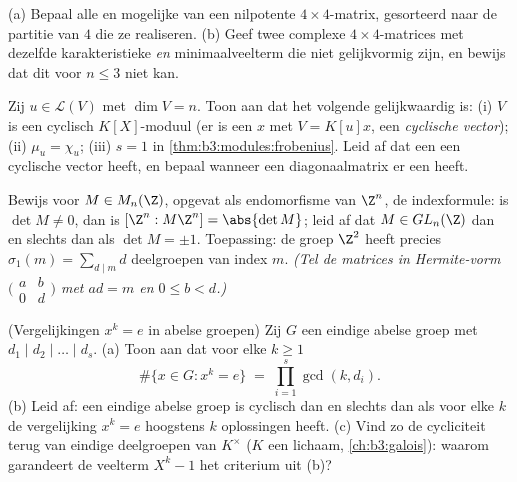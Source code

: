 \begin{exercise}[$\star\star$]\label{exo:b3:modules:8}
(a) Bepaal alle  en mogelijke
 van een nilpotente $4 \times 4$-matrix, gesorteerd
naar de partitie van $4$ die ze realiseren.
(b) Geef twee complexe $4\times4$-matrices met dezelfde
karakteristieke \emph{en} minimaalveelterm die niet gelijkvormig
zijn, en bewijs dat dit voor $n \leq 3$ niet kan.
\end{exercise}

\begin{exercise}[$\star\star\star$]\label{exo:b3:modules:9}
Zij $u \in \mathcal L(V)$ met $\dim V = n$. Toon aan dat het
volgende gelijkwaardig is: (i) $V$ is een cyclisch $K[X]$-moduul
(er is een $x$ met $V = K[u]x$, een \emph{cyclische vector});
(ii) $\mu_u = \chi_u$; (iii) $s = 1$ in
\cref{thm:b3:modules:frobenius}. Leid af dat een  een cyclische vector heeft, en bepaal wanneer een
diagonaalmatrix er een heeft.
\end{exercise}

\begin{exercise}[$\star\star\star$]\label{exo:b3:modules:10}
Bewijs voor $M \in M_n(\Z)$, opgevat als endomorfisme van $\Z^n$,
de indexformule: is $\det M \ne 0$, dan is $[\Z^n : M\Z^n] =
\abs{\det M}$; leid af dat $M \in GL_n(\Z)$ dan en slechts dan als
$\det M = \pm 1$. Toepassing: de groep $\Z^2$ heeft precies
$\sigma_1(m) = \sum_{d \mid m} d$ deelgroepen van index $m$.
\emph{(Tel de matrices in Hermite-vorm
$\bigl(\begin{smallmatrix} a & b\\ 0 & d\end{smallmatrix}\bigr)$
met $ad = m$ en $0 \leq b < d$.)}
\end{exercise}

\begin{exercise}[$\star\star$]\label{exo:b3:modules:11}
(Vergelijkingen $x^k = e$ in abelse groepen) Zij $G$ een eindige
abelse groep met  $d_1 \mid d_2 \mid \dots \mid
d_s$.
(a) Toon aan dat voor elke $k \geq 1$
\[
\#\{x \in G : x^k = e\} \;=\; \prod_{i=1}^{s}\gcd(k, d_i) .
\]
(b) Leid af: een eindige abelse groep is cyclisch dan en slechts
dan als voor elke $k$ de vergelijking $x^k = e$ hoogstens $k$
oplossingen heeft.
(c) Vind zo de cycliciteit terug van eindige deelgroepen van
$K^\times$ ($K$ een lichaam, \cref{ch:b3:galois}): waarom
garandeert de veelterm $X^k - 1$ het criterium uit (b)?
\end{exercise}

